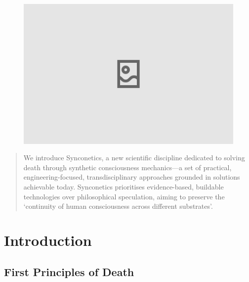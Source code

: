 \documentclass[10pt]{article}
\begin{document}
\begin{sloppypar}

  \begin{figure}[ht]
    \centering
    \includegraphics[width=\textwidth]{figures/cover.png}
    \label{fig:cover}
  \end{figure}
  \newpage


  \begin{abstract}
    We introduce Synconetics, a new scientific discipline dedicated to solving death through synthetic consciousness mechanics—a set of practical, engineering-focused, transdisciplinary approaches grounded in solutions achievable today. Synconetics prioritises evidence-based, buildable technologies over philosophical speculation, aiming to preserve the ‘continuity of human consciousness across different substrates’.
  \end{abstract}

  \pagebreak
  \tableofcontents
  \pagebreak


  \section{Introduction}
  \label{sec:introduction}

  \subsection{First Principles of Death}
  \label{sec:first-principles}


\end{sloppypar}
\end{document}
